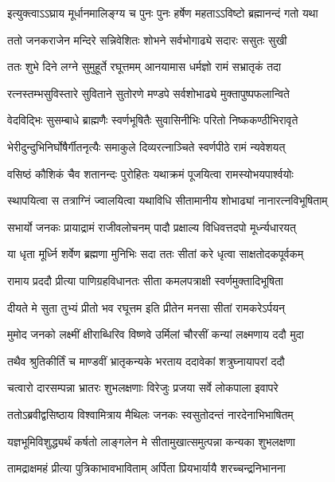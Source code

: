 \twolineshloka
{इत्युक्त्वाऽऽघ्राय मूर्धानमालिङ्ग्य च पुनः पुनः}
{हर्षेण महताऽऽविष्टो ब्रह्मानन्दं गतो यथा} %

\twolineshloka
{ततो जनकराजेन मन्दिरे सन्निवेशितः}
{शोभने सर्वभोगाढ्ये सदारः ससुतः सुखी} %

\twolineshloka
{ततः शुभे दिने लग्ने सुमुहूर्ते रघूत्तमम्}
{आनयामास धर्मज्ञो रामं सभ्रातृकं तदा} %

\twolineshloka
{रत्नस्तम्भसुविस्तारे सुविताने सुतोरणे}
{मण्डपे सर्वशोभाढ्ये मुक्तापुष्पफलान्विते} %

\twolineshloka
{वेदविद्भिः सुसम्बाधे ब्राह्मणैः स्वर्णभूषितैः}
{सुवासिनीभिः परितो निष्ककण्ठीभिरावृते} %

\twolineshloka
{भेरीदुन्दुभिनिर्घोषैर्गीतनृत्यैः समाकुले}
{दिव्यरत्नाञ्चिते स्वर्णपीठे रामं न्यवेशयत्} %

\twolineshloka
{वसिष्ठं कौशिकं चैव शतानन्दः पुरोहितः}
{यथाक्रमं पूजयित्वा रामस्योभयपार्श्वयोः} %

\twolineshloka
{स्थापयित्वा स तत्राग्निं ज्वालयित्वा यथाविधि}
{सीतामानीय शोभाढ्यां नानारत्नविभूषिताम्} %

\twolineshloka
{सभार्यो जनकः प्रायाद्रामं राजीवलोचनम्}
{पादौ प्रक्षाल्य विधिवत्तदपो मूर्ध्न्यधारयत्} %

\twolineshloka
{या धृता मूर्ध्नि शर्वेण ब्रह्मणा मुनिभिः सदा}
{ततः सीतां करे धृत्वा साक्षतोदकपूर्वकम्} %

\twolineshloka
{रामाय प्रददौ प्रीत्या पाणिग्रहविधानतः}
{सीता कमलपत्राक्षी स्वर्णमुक्तादिभूषिता} %

\twolineshloka
{दीयते मे सुता तुभ्यं प्रीतो भव रघूत्तम}
{इति प्रीतेन मनसा सीतां रामकरेऽर्पयन्} %

\twolineshloka
{मुमोद जनको लक्ष्मीं क्षीराब्धिरिव विष्णवे}
{उर्मिलां चौरसीं कन्यां लक्ष्मणाय ददौ मुदा} %

\twolineshloka
{तथैव श्रुतिकीर्तिं च माण्डवीं भ्रातृकन्यके}
{भरताय ददावेकां शत्रुघ्नायापरां ददौ} %

\twolineshloka
{चत्वारो दारसम्पन्ना भ्रातरः शुभलक्षणाः}
{विरेजुः प्रजया सर्वे लोकपाला इवापरे} %

\twolineshloka
{ततोऽब्रवीद्वसिष्ठाय विश्वामित्राय मैथिलः}
{जनकः स्वसुतोदन्तं नारदेनाभिभाषितम्} %

\twolineshloka
{यज्ञभूमिविशुद्ध्यर्थं कर्षतो लाङ्गलेन मे}
{सीतामुखात्समुत्पन्ना कन्यका शुभलक्षणा} %

\twolineshloka
{तामद्राक्षमहं प्रीत्या पुत्रिकाभावभाविताम्}
{अर्पिता प्रियभार्यायै शरच्चन्द्रनिभानना} %

